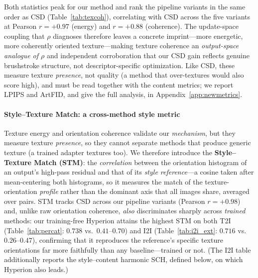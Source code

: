 Both statistics peak for our method and rank the pipeline variants in the same
order as CSD (Table~\ref{tab:texcoh}), correlating with CSD across the five
variants at Pearson $r{=}{+}0.97$ (energy) and $r{=}{+}0.88$ (coherence). The
update-space coupling that $\rho$ diagnoses therefore leaves a concrete
imprint---more energetic, more coherently oriented texture---making texture
coherence an \emph{output-space analogue of $\rho$} and independent corroboration
that our CSD gain reflects genuine brushstroke structure, not descriptor-specific
optimization. Like CSD, these measure texture \emph{presence}, not quality (a
method that over-textures would also score high), and must be read together with
the content metrics; we report LPIPS and ArtFID, and give the full analysis, in
Appendix~\ref{app:newmetrics}.

\paragraph{Style--Texture Match: a cross-method style metric}
Texture energy and orientation coherence validate our \emph{mechanism}, but they
measure texture \emph{presence}, so they cannot separate methods that produce
generic texture (a trained adapter textures too). We therefore introduce the
\textbf{Style--Texture Match (STM)}: the \emph{correlation} between the
orientation histogram of an output's high-pass residual and that of its
\emph{style reference}---a cosine taken after mean-centering both histograms, so
it measures the match of the texture-orientation \emph{profile} rather than the
dominant axis that all images share, averaged over pairs. STM
tracks CSD across our pipeline variants (Pearson $r{=}{+}0.98$) and, unlike raw
orientation coherence, \emph{also} discriminates sharply across \emph{trained}
methods: our training-free Hyperion attains the highest STM on both T2I
(Table~\ref{tab:percat}: $0.738$ vs.\ $0.41$--$0.70$) and I2I
(Table~\ref{tab:i2i_ext}: $0.716$ vs.\ $0.26$--$0.47$), confirming that it
reproduces the reference's specific texture orientations far more faithfully than
any baseline---trained or not. (The I2I table additionally reports the
style--content harmonic SCH, defined below, on which Hyperion also leads.)

